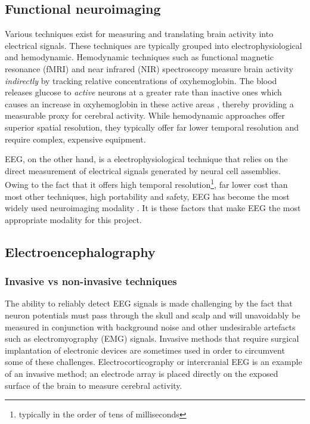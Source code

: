 \subsection{Functional neuroimaging}
Various techniques exist for measuring and translating brain activity into electrical signals. These techniques are typically grouped into electrophysiological and hemodynamic. Hemodynamic techniques such as functional magnetic resonance (fMRI) and near infrared (NIR) spectroscopy measure brain activity \textit{indirectly }by tracking relative concentrations of oxyhemoglobin. The blood releases glucose to \textit{active} neurons at a greater rate than inactive ones which causes an increase in oxyhemoglobin in these active areas \cite{bci-survey-nicolas-alonso}, thereby providing a measurable proxy for cerebral activity. While hemodynamic approaches offer superior spatial resolution, they typically offer far lower temporal resolution and require complex, expensive equipment. 

EEG, on the other hand, is a electrophysiological technique that relies on the direct measurement of electrical signals generated by neural cell assemblies. Owing to the fact that it offers high temporal resolution\footnote{typically in the order of tens of milliseconds}, far lower cost than most other techniques, high portability and safety, EEG has become the most widely used neuroimaging modality \cite{bci-survey-nicolas-alonso}. It is these factors that make EEG the most appropriate modality for this project.

\subsection{Electroencephalography}

\subsubsection{Invasive vs non-invasive techniques}

The ability to reliably detect EEG signals is made challenging by the fact that neuron potentials must pass through the skull and scalp and will unavoidably be measured in conjunction with background noise and other undesirable artefacts such as electromyography (EMG) signals. Invasive methods that require surgical implantation of electronic devices are sometimes used in order to circumvent some of these challenges. Electrocorticography or intercranial EEG is an example of an invasive method; an electrode array is placed directly on the exposed surface of the brain to measure cerebral activity. 

